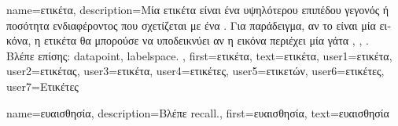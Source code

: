 {name={\foreignlanguage{greek}{ετικέτα}},
	description={\foreignlanguage{greek}{Μία ετικέτα είναι ένα υψηλότερου επιπέδου γεγονός ή ποσότητα 
		ενδιαφέροντος} \foreignlanguage{greek}{που σχετίζεται με ένα} 
		. \foreignlanguage{greek}{Για παράδειγμα, αν το}  
		\foreignlanguage{greek}{είναι μία εικόνα, η ετικέτα θα μπορούσε να υποδεικνύει αν η εικόνα περιέχει 
		μία γάτα} \cite{Gujarati2021}, \cite{Dodge2003}, \cite{Everitt2022}.
		\\
		\foreignlanguage{greek}{Βλέπε επίσης:} \gls{datapoint}, \gls{labelspace}. },
	first={\foreignlanguage{greek}{ετικέτα}},
	text={\foreignlanguage{greek}{ετικέτα}},
	user1={\foreignlanguage{greek}{ετικέτα}}, %
  	user2={\foreignlanguage{greek}{ετικέτας}}, %
	user3={\foreignlanguage{greek}{ετικέτα}}, %
	user4={\foreignlanguage{greek}{ετικέτες}}, %
  	user5={\foreignlanguage{greek}{ετικετών}}, %
	user6={\foreignlanguage{greek}{ετικέτες}}, %
	user7={\foreignlanguage{greek}{Ετικέτες}} %
}

{name={\foreignlanguage{greek}{ευαισθησία}}, 
	description={\foreignlanguage{greek}{Βλέπε} \gls{recall}.},
	first={\foreignlanguage{greek}{ευαισθησία}}, 
	text={\foreignlanguage{greek}{ευαισθησία}}
}

